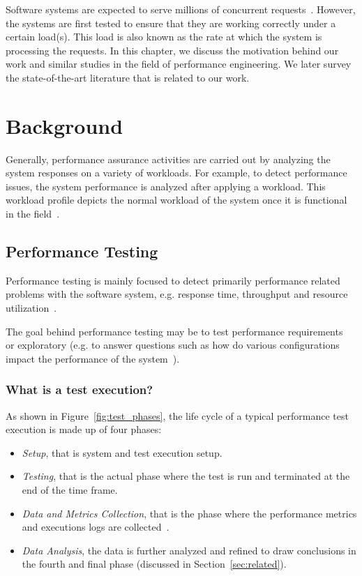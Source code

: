 

Software systems are expected to serve millions of concurrent requests~\cite{arlitt2000workload}. However, the systems are first tested to ensure that they are working correctly under a certain load(s). This load is also known as the rate at which the system is processing the requests. 
In this chapter, we discuss the motivation behind our work and similar studies in the field of performance engineering. We later survey the state-of-the-art literature that is related to our work.

\section{Background}

Generally, performance assurance activities are carried out by analyzing the system responses on a variety of workloads. For example, to detect performance issues, the system performance is analyzed after applying a workload. This workload profile depicts the normal workload of the system once it is functional in the field~\cite{464549}.


\subsection{Performance Testing}

Performance testing is mainly focused to detect primarily performance related problems with the software system, e.g. response time, throughput and resource utilization~\cite{Barna:2011,6032540,Gorton}.

The goal behind performance testing may be to test performance requirements~\cite{pozin2011models} or exploratory (e.g. to answer questions such as how do various configurations impact the performance of the system~\cite{Menasce:2000,Menasce:1994,Menasce:2001,pozin2011models}).

\subsubsection{What is a test execution?}

As shown in Figure~\ref{fig:test_phases}, the life cycle of a typical performance test execution is made up of four phases:

\begin{itemize}
	\item \textit{Setup}, that is system and test execution setup.
	\item \textit{Testing}, that is the actual phase where the test is run and terminated at the end of the time frame.
	\item \textit{Data and Metrics Collection}, that is the phase where the performance metrics and executions logs are collected~\cite{jiang2015survey}.
	\item \textit{Data Analysis}, the data is further analyzed and refined to draw conclusions in the fourth and final phase (discussed in Section~\ref{sec:related}).	
\end{itemize}
 


